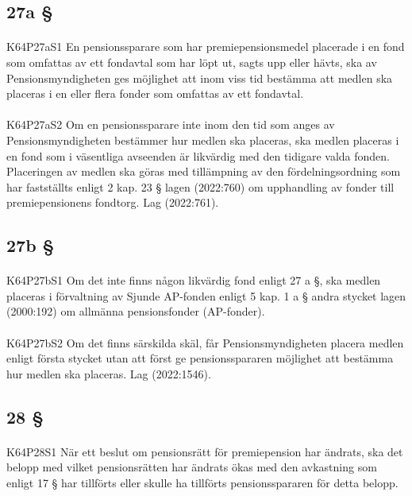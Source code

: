\documentclass[a4paper,notitlepage,openany,10pt]{book}
\begin{document}
\subsection*{27a §}
\paragraph*{}
{\tiny K64P27aS1}
En pensionssparare som har premiepensionsmedel placerade i en fond som omfattas av ett fondavtal som har löpt ut, sagts upp eller hävts, ska av Pensionsmyndigheten ges möjlighet att inom viss tid bestämma att medlen ska placeras i en eller flera fonder som omfattas av ett fondavtal.
\paragraph*{}
{\tiny K64P27aS2}
Om en pensionssparare inte inom den tid som anges av Pensionsmyndigheten bestämmer hur medlen ska placeras, ska medlen placeras i en fond som i väsentliga avseenden är likvärdig med den tidigare valda fonden. Placeringen av medlen ska göras med tillämpning av den fördelningsordning som har fastställts enligt 2 kap. 23 § lagen (2022:760) om upphandling av fonder till premiepensionens fondtorg.
Lag (2022:761).
\subsection*{27b §}
\paragraph*{}
{\tiny K64P27bS1}
Om det inte finns någon likvärdig fond enligt 27 a §, ska medlen placeras i förvaltning av Sjunde AP-fonden enligt 5 kap. 1 a § andra stycket lagen (2000:192) om allmänna pensionsfonder (AP-fonder).
\paragraph*{}
{\tiny K64P27bS2}
Om det finns särskilda skäl, får Pensionsmyndigheten placera medlen enligt första stycket utan att först ge pensionsspararen möjlighet att bestämma hur medlen ska placeras.
Lag (2022:1546).
\subsection*{28 §}
\paragraph*{}
{\tiny K64P28S1}
När ett beslut om pensionsrätt för premiepension har ändrats, ska det belopp med vilket pensionsrätten har ändrats ökas med den avkastning som enligt 17 § har tillförts eller skulle ha tillförts pensionsspararen för detta belopp.
\end{document}
